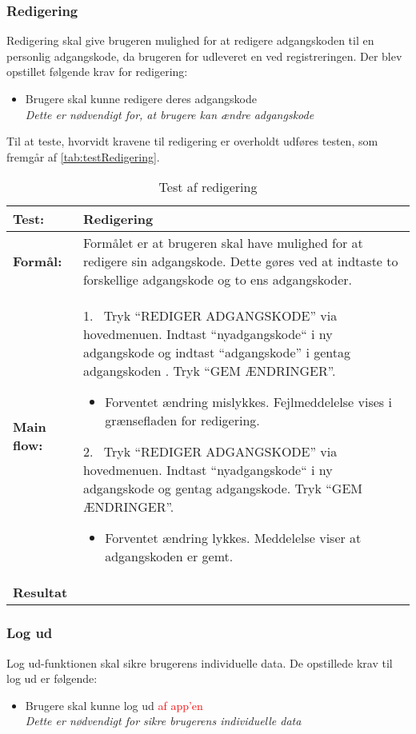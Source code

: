 \subsubsection{Redigering}
Redigering skal give brugeren mulighed for at redigere adgangskoden til en personlig adgangskode, da brugeren for udleveret en ved registreringen. Der blev opstillet følgende krav for redigering:

\begin{itemize}
\item Brugere skal kunne redigere deres adgangskode
\\
\textit{Dette er nødvendigt for, at brugere kan ændre adgangskode}
\end{itemize}

\noindent
Til at teste, hvorvidt kravene til redigering er overholdt udføres testen, som fremgår af \autoref{tab:testRedigering}.

\begin{table} [H]
	\centering
  \begin{tabular}{ | l | p{14cm} |} \hline
    \textbf{Test:} & Redigering \\ \hline
  \textbf{Formål:} & Formålet er at brugeren skal have mulighed for at redigere sin adgangskode. Dette gøres ved at indtaste to forskellige adgangskode og to ens adgangskoder. 
 \\ \hline
 	\textbf{Main flow:} & 1.~ Tryk “REDIGER ADGANGSKODE” via hovedmenuen. Indtast “nyadgangskode“ i ny adgangskode og indtast “adgangskode” i gentag adgangskoden . Tryk “GEM ÆNDRINGER”.   
 	\begin{itemize} [label={\checkmark}]
 	\item Forventet ændring mislykkes. Fejlmeddelelse vises i grænsefladen for redigering.
 	\end{itemize}	
 	2.~ Tryk “REDIGER ADGANGSKODE” via hovedmenuen. Indtast “nyadgangskode“ i ny adgangskode og gentag adgangskode. Tryk “GEM ÆNDRINGER”. 
 	\begin{itemize}[label={\checkmark}]
 	\item Forventet ændring lykkes. Meddelelse viser at adgangskoden er gemt. 
	\end{itemize}
\\ \hline
\textbf{Resultat} &\\ \hline
   \end{tabular}
   \caption{Test af redigering}
    \label{tab:testRedigering}
\end{table}


\subsubsection{Log ud}
Log ud-funktionen skal sikre brugerens individuelle data. De opstillede krav til log ud er følgende:
\begin{itemize}
\item Brugere skal kunne log ud \textcolor{red}{af app’en}
\\
\textit{Dette er nødvendigt for sikre brugerens individuelle data}
\end{itemize}

